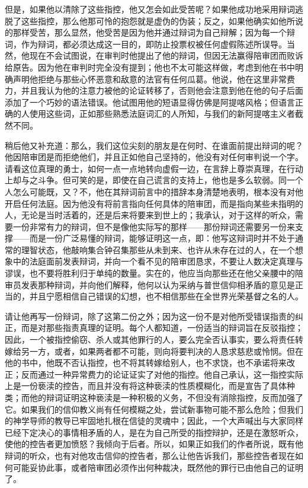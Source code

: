 但是，如果他以清除了这些指控，他又怎会如此受苦呢？如果他成功地采用辩词逃脱了这些指控，那么他那可怜的抱怨就是虚伪的伪装；反之，如果他确实如他所说的那样受苦，那么显然，他受苦是因为他并通过辩词为自己辩解；因为每一个辩词，作为辩词，都必须达成这一目的，即防止投票权被任何虚假陈述所误导。当然，他现在不会试图说，在审判时他提出了他的辩词，但因无法赢得陪审团而败诉给原告。因为他在审判时完全没有提到；他也不太可能这样做，考虑到他在书中明确声明他拒绝与那些心怀恶意和敌意的法官有任何瓜葛。他说，他在这里非常费力，并且我认为他的注意力被他的论证转移了，否则他会注意到他在他的句子后面添加了一个巧妙的语法错误。他试图用他的短语显得仿佛是阿提喀风格；但语言正确的人使用这些词，正如那些熟悉法庭词汇的人所知，与我们的新阿提喀主义者截然不同。\par

稍后他又补充道：那么，我们这位尖刻的朋友是在何时、在谁面前提出辩词的呢？他因陪审团是而拒绝他们，并且正如他自己坚持的，他没有对任何审判说一个字。请看这位真理的勇士，如何一点一点地转向虚假一边，在言辞上尊崇真理，在行动上却与之斗争。但可笑的是，即使在自己谎言的支持上，他也是多么软弱。同一个人怎么可能既，又？不，他在其辩词前言中的措辞本身清楚地表明，根本没有对他开启任何法庭。因为他没有将前言指向任何具体的陪审团，而是指向某些未指明的人，无论是当时活着的，还是后来将要来到世上的；我承认，对于这样的听众，需要一份非常有力的辩词，但不是像他实际写的那样——那份辩词还需要另一份来支撑——而是一份广泛易懂的辩词，能够证明这一点，即：他写这辩词时并不处于通常的理智状态，他敲响集合钟召集那些从未到来、也许从未存在过的人，在一个想象中的法庭面前发表辩词，并向一个看不见的陪审团恳求，不要让人数决定真理与谬误，也不要将胜利归于单纯的数量。实在的，他应当向那些还在他父亲腰中的陪审员发表那种辩词，并向他们解释，他何以认为采纳与普世信仰相矛盾的意见是正当的，并且宁愿相信自己错误的幻想，也不相信那些在全世界光荣基督之名的人。\par

请让他再写一份辩词，除了这第二份之外；因为这一份不是对他所受错误指责的纠正，而是对那些指责真理的证明。每个人都知道，一份适当的辩词旨在反驳指控；因此，一个被指控偷窃、杀人或其他罪行的人，要么完全否认事实，要么将责任转嫁给另一方，或者，如果两者都不可能，则向将要判决的人恳求慈悲或怜悯。但在他的书中，他既不否认指控，也不将其转嫁给别人，也不求饶，也不承诺将来改正；反而通过一种异常费力的论证证实了对他的指控。他自己承认，这一指控实际上是一份亵渎的控告，而且并没有将这种亵渎的性质模糊化，而是宣告了具体种类；而他的辩词证明这种亵渎是一种积极的义务，不但没有消除指控，反而加强了它。如果我们的信仰教义尚有任何模糊之处，尝试新事物可能不那么危险；但我们的神学导师的教导已牢固地扎根在信徒的灵魂中；因此，一个大声喊出与大家同样已经下定决心的事情相矛盾的人，是在为自己所受的指控辩护，还是在激怒听众，使他的控告者更加愤怒？我倾向于后者。所以，如果正如我们的作者所说，既有他辩词的听众，也有对他攻击信仰的控告者，那么让他告诉我们，那些控告者现在如何可能妥协此事，或者陪审团必须作出何种裁决，既然他的罪行已由他自己的证明了。\par

